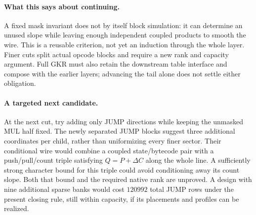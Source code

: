 \documentclass[11pt]{article}
\begin{document}
\paragraph{What this says about continuing.} A fixed mask invariant does not by itself block simulation: it can determine an unused slope while leaving enough independent coupled products to smooth the wire. This is a reusable criterion, not yet an induction through the whole layer. Finer cuts split actual opcode blocks and require a new rank and capacity argument. Full GKR must also retain the downstream table interface and compose with the earlier layers; advancing the tail alone does not settle either obligation.

\paragraph{A targeted next candidate.} At the next cut, try adding only JUMP directions while keeping the unmasked MUL half fixed. The newly separated JUMP blocks suggest three additional coordinates per child, rather than uniformizing every finer sector. Their conditional wire would combine a coupled state/bytecode pair with a push/pull/count triple satisfying $Q=P+\Delta C$ along the whole line. A sufficiently strong character bound for this triple could avoid conditioning away its count slope. Both that bound and the required native rank are unproved. A design with nine additional sparse banks would cost $120992$ total JUMP rows under the present closing rule, still within capacity, if its placements and profiles can be realized.
\end{document}
